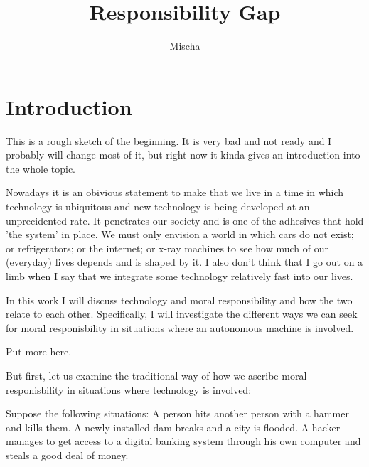 \documentclass{article}
\title{Responsibility Gap}
\author{Mischa}
\begin{document}
\begin{titlepage}
	\maketitle
\end{titlepage}
\tableofcontents
\newpage
\section{Introduction}

This is a rough sketch of the beginning. It is very bad and not ready and I probably will
change most of it, but right now it kinda gives an introduction into the whole
topic.  

Nowadays it is an obivious statement to make that we live in a time in
which technology is ubiquitous and new technology is being developed at an
unprecidented rate. It penetrates our society and is one of the adhesives that
hold 'the system' in place. We must only envision a world in which cars do not
exist; or refrigerators; or the internet; or x-ray machines to see how much of
our (everyday) lives depends and is shaped by it. I also don't think that I go
out on a limb when I say that we integrate some technology relatively fast into
our lives. 



In this work I will discuss technology and moral responsibility and how the two
relate to each other. Specifically, I will investigate the different ways we can seek
for moral responisbility in situations where an autonomous machine is involved.

Put more here.

But first, let us examine the traditional way of how we ascribe moral
responisbility in situations where technology is involved:

Suppose the following situations: A person hits another person with a hammer and
kills them. A newly installed dam breaks and a city is flooded. A hacker manages
to get access to a digital banking system through his own computer and steals a
good deal of money.\\
\end{document}
